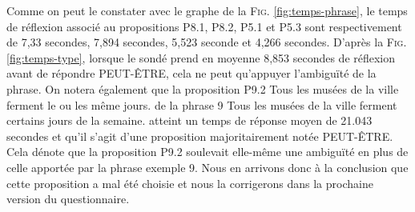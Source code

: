 \documentclass[11pt,letterpaper]{article}
\begin{document}
Comme on peut le constater avec le graphe de la \textsc{Fig. }\ref{fig:temps-phrase}, le temps de réflexion associé au propositions P8.1, P8.2, P5.1 et P5.3 sont respectivement de 7,33 secondes, 7,894 secondes, 5,523 seconde et 4,266 secondes. D'après la \textsc{Fig. }\ref{fig:temps-type}, lorsque le sondé prend en moyenne 8,853 secondes de réflexion avant de répondre PEUT-ÊTRE, cela ne peut qu'appuyer l'ambiguïté de la phrase. On notera également que la proposition P9.2 \og Tous les musées de la ville ferment le ou les même jours. \fg{} de la phrase 9 \og Tous les musées de la ville ferment certains jours de la semaine. \fg{} atteint un temps de réponse moyen de 21.043 secondes et qu'il s'agit d'une proposition majoritairement notée PEUT-ÊTRE. Cela dénote que la proposition P9.2 soulevait elle-même une ambiguïté en plus de celle apportée par la phrase exemple 9. Nous en arrivons donc à la conclusion que cette proposition a mal été choisie et nous la corrigerons dans la prochaine version du questionnaire.

\vspace{13px}
\end{document}
